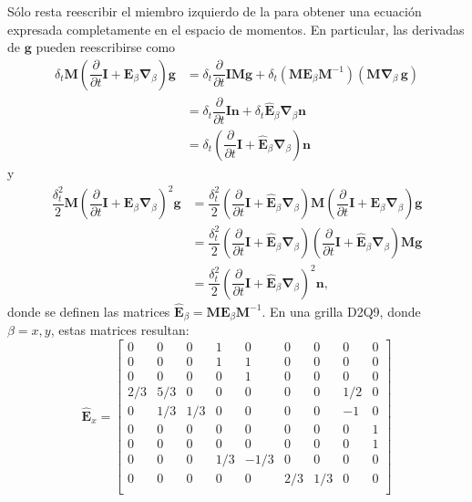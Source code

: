 S\'olo resta reescribir el miembro izquierdo de la  para obtener una ecuaci\'on expresada completamente en el espacio de momentos. En particular, las derivadas de $\bm{g}$ pueden reescribirse como
\begin{equation}
	\begin{aligned}
		\delta_t \bm{M}\left( \dfrac{\partial}{\partial t} \bm{I} + \bm{E}_{\beta}\bm{\nabla}_{\beta} \right) \bm{g} &= \delta_t \dfrac{\partial}{\partial t}\bm{IMg} + \delta_t ( \bm{M} \bm{E}_{\beta} \bm{M}^{-1} )( \bm{M} \bm{\nabla}_{\beta} \, \bm{g}) \\
		&= \delta_t \dfrac{\partial}{\partial t}\bm{In} + \delta_t \hat{\bm{E}}_{\beta} \bm{\nabla}_{\beta} \bm{n} \\
		&= \delta_t\left( \dfrac{\partial}{\partial t}\bm{I} + \hat{\bm{E}}_{\beta} \bm{\nabla}_{\beta} \right) \bm{n}
	\end{aligned}
	\label{eq:M_propag_1}
\end{equation}
y
\begin{equation}
	\begin{aligned}
		\dfrac{\delta^2_t}{2} \bm{M}\left( \dfrac{\partial}{\partial t} \bm{I} + \bm{E}_{\beta}\bm{\nabla}_{\beta} \right)^2 \bm{g} 
		&= \dfrac{\delta^2_t}{2} \left( \dfrac{\partial}{\partial t}\bm{I} + \hat{\bm{E}}_{\beta} \bm{\nabla}_{\beta} \right) \bm{M} \left( \dfrac{\partial}{\partial t}\bm{I} + \bm{E}_{\beta} \bm{\nabla}_{\beta} \right) \bm{g} \\
		&= \dfrac{\delta^2_t}{2} \left( \dfrac{\partial}{\partial t}\bm{I} + \hat{\bm{E}}_{\beta} \bm{\nabla}_{\beta} \right) \left( \dfrac{\partial}{\partial t}\bm{I} + \hat{\bm{E}}_{\beta} \bm{\nabla}_{\beta} \right) \bm{Mg} \\
		&= \dfrac{\delta^2_t}{2} \left( \dfrac{\partial}{\partial t}\bm{I} + \hat{\bm{E}}_{\beta} \bm{\nabla}_{\beta} \right)^2 \bm{n},
	\end{aligned}
	\label{eq:M_propag_2}
\end{equation}
donde se definen las matrices $\hat{\bm{E}}_{\beta} = \bm{M} \bm{E}_{\beta} \bm{M}^{-1}$. En una grilla D2Q9, donde $\beta=x,y$, estas matrices resultan:
\begin{equation}
	\hat{\bm{E}}_{x}=
	\begin{bmatrix}
	0 & 0 & 0 & 1 & 0 & 0 & 0 & 0 & 0 \\
	0 & 0 & 0 & 1 & 1 & 0 & 0 & 0 & 0 \\
	0 & 0 & 0 & 0 & 1 & 0 & 0 & 0 & 0 \\
	2/3 & 5/3 & 0 & 0 & 0 & 0 & 0 & 1/2 & 0 \\
	0 & 1/3 & 1/3 & 0 & 0 & 0 & 0 & -1 & 0 \\
	0 & 0 & 0 & 0 & 0 & 0 & 0 & 0 & 1 \\
	0 & 0 & 0 & 0 & 0 & 0 & 0 & 0 & 1 \\
	0 & 0 & 0 & 1/3 & -1/3 & 0 & 0 & 0 & 0 \\
	0 & 0 & 0 & 0 & 0 & 2/3 & 1/3 & 0 & 0 \\
	\end{bmatrix}
\end{equation} 

